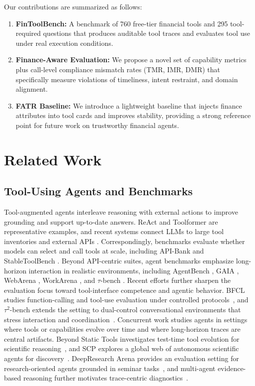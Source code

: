 \documentclass[sigconf,nonacm]{acmart}
\newcommand{\tmr}{\textsc{TMR}\xspace}
\newcommand{\imr}{\textsc{IMR}\xspace}
\newcommand{\dmr}{\textsc{DMR}\xspace}
\begin{document}
Our contributions are summarized as follows:
\begin{enumerate}[leftmargin=*]
\item \textbf{FinToolBench:} A benchmark of 760 free-tier financial tools and 295 tool-required questions that produces auditable tool traces and evaluates tool use under real execution conditions.
\item \textbf{Finance-Aware Evaluation:} We propose a novel set of capability metrics plus call-level compliance mismatch rates (\tmr{}, \imr{}, \dmr{}) that specifically measure violations of timeliness, intent restraint, and domain alignment.
\item \textbf{FATR Baseline:} We introduce a lightweight baseline that injects finance attributes into tool cards and improves stability, providing a strong reference point for future work on trustworthy financial agents.
\end{enumerate}


\section{Related Work}\label{sec:related}
\subsection{Tool-Using Agents and Benchmarks}
Tool-augmented agents interleave reasoning with external actions to improve grounding and support up-to-date answers.
ReAct \cite{yao2022react} and Toolformer \cite{schick2023toolformer} are representative examples, and recent systems connect LLMs to large tool inventories and external APIs \cite{patil2024gorilla,qin2023toolllm}.
Correspondingly, benchmarks evaluate whether models can select and call tools at scale, including API-Bank \cite{li2023api} and StableToolBench \cite{guo2024stabletoolbench}.
Beyond API-centric suites, agent benchmarks emphasize long-horizon interaction in realistic environments, including AgentBench \cite{liu2023agentbench}, GAIA \cite{mialon2023gaia}, WebArena \cite{zhou2023webarena}, WorkArena \cite{drouin2024workarena}, and $\tau$-bench \cite{narasimhan2024tau}.
Recent efforts further sharpen the evaluation focus toward tool-interface competence and agentic behavior. BFCL studies function-calling and tool-use evaluation under controlled protocols~\cite{patilberkeley}, and $\tau^2$-bench extends the setting to dual-control conversational environments that stress interaction and coordination~\cite{barres2025tau2}.
Concurrent work studies agents in settings where tools or capabilities evolve over time and where long-horizon traces are central artifacts. Beyond Static Tools investigates test-time tool evolution for scientific reasoning~\cite{lu2026beyondstatictools}, and SCP explores a global web of autonomous scientific agents for discovery~\cite{jiang2025scp}. DeepResearch Arena provides an evaluation setting for research-oriented agents grounded in seminar tasks~\cite{wan2025deepresearcharena}, and multi-agent evidence-based reasoning further motivates trace-centric diagnostics~\cite{yang2025fromwhat}.
\end{document}
